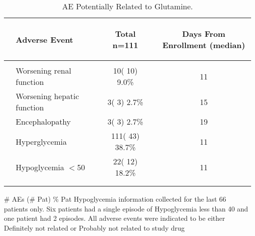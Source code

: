 \documentclass[dvips,10pt]{article}
\begin{document}
\begin{table}[t]
\caption
{ AE Potentially Related to Glutamine. }
\begin{center}
\begin{tabular}{ @{}l@{}
@{}l@{}@{}p{1.5em}@{}@{}c@{}@{}p{1.5em}@{}@{}c@{}
}
\hline

& \parbox{6em}{\begin{center}Adverse Event\end{center}} && \parbox{6em}{\begin{center}Total n=111\end{center}} && \parbox{6em}{\begin{center}Days From Enrollment  (median)\end{center}} \\

\hline

\\
& Worsening renal function && 10( 10)  9.0\% && 11 \\
& Worsening hepatic function && 3(  3)  2.7\% && 15 \\
& Encephalopathy && 3(  3)  2.7\% && 19 \\
& Hyperglycemia && 111( 43) 38.7\% && 11 \\
& Hypoglycemia $<$50 && 22( 12) 18.2\% && 11 \\
\\
\hline \\

\end{tabular}


\parbox{ 5in }{ \# AEs (\# Pat) \% Pat \newline Hypoglycemia information collected for the last 66 patients only.   Six patients had a single episode of Hypoglycemia less than 40 and one patient had 2 episodes. \newline \newline All adverse events were indicated to be either Definitely not related or Probably not related 
 to study drug } \\
 \vspace{1em}\end{center}
 \end{table}
\clearpage
\end{document}
